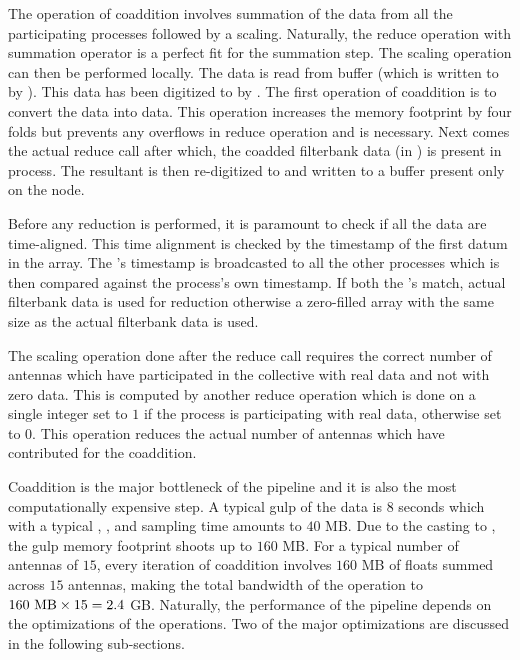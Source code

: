 \par The operation of coaddition involves summation of the data from all the participating processes followed by a scaling. Naturally, the reduce operation with summation operator is a perfect fit for the summation step. 
The scaling operation can then be performed locally. 
The data is read from \dada buffer (which is written to by \pb). This data has been digitized to \nbit by \pb. 
The first operation of coaddition is to convert the \nbit data into \float data. 
This operation increases the memory footprint by four folds but prevents any overflows in reduce operation and is necessary. 
Next comes the actual \mpi reduce call after which, the coadded filterbank data (in \float) is present in \root process.
The resultant \float is then re-digitized to \nbit and written to a \dada buffer present only on the \root node.

\par Before any reduction is performed, it is paramount to check if all the data are time-aligned. 
This time alignment is checked by the \mjd timestamp of the first datum in the array. 
The \root's timestamp is broadcasted to all the other processes which is then compared against the process's own \mjd timestamp. 
If both the \mjd's match, actual filterbank data is used for reduction otherwise a zero-filled array with the same size as the actual filterbank data is used.

\par The scaling operation done after the \mpi reduce call requires the correct number of antennas which have participated in the collective with real data and not with zero data. 
This is computed by another \mpi reduce operation which is done on a single integer set to $1$ if the process is participating with real data, otherwise set to $0$. This operation reduces the actual number of antennas which have contributed for the coaddition.

\par Coaddition is the major bottleneck of the pipeline and it is also the most computationally expensive step. 
A typical gulp of the data is $8$ seconds which with a typical , , and sampling time amounts to $40$ MB.
Due to the casting to \float, the gulp memory footprint shoots up to $160$ MB.
For a typical number of antennas of $15$, every iteration of coaddition involves $160$ MB of floats summed across $15$ antennas, 
making the total bandwidth of the operation to $160\ {\rm MB} \times 15 = 2.4$ GB.
Naturally, the performance of the pipeline depends on the optimizations of the \mpi operations.
Two of the major optimizations are discussed in the following sub-sections.

